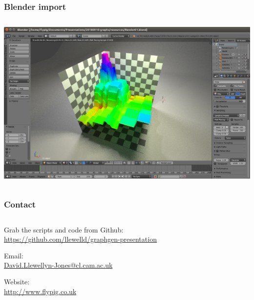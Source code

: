 \documentclass[handout, notes=hide]{beamer}
\begin{document}

\begin{frame}[fragile]
\frametitle{Blender import}
\setlength{\parskip}{0.5em}

\begin{columns}[T]
\begin{column}[T]{1.1\textwidth}
\vspace{-0.5em}

\includegraphics[width=1.0\textwidth]{blender}

\end{column}
\end{columns}


\end{frame}
\note{
\setlength{\parskip}{0.5em}
}

\begin{frame}[fragile]
\frametitle{Contact}

\begin{columns}[T]
\begin{column}[T]{1.0\textwidth}
\setlength{\parskip}{1.0em}

Grab the scripts and code from Github: \\
\qquad \url{https://github.com/llewelld/graphgen-presentation}

Email: \\
\qquad \href{mailto:David.Llewellyn-Jones@cl.cam.ac.uk}{David.Llewellyn-Jones@cl.cam.ac.uk}

Website: \\
\qquad \url{http://www.flypig.co.uk}

\end{column}
\end{columns}


\end{frame}
\note{
\setlength{\parskip}{0.5em}
}

\end{document}

